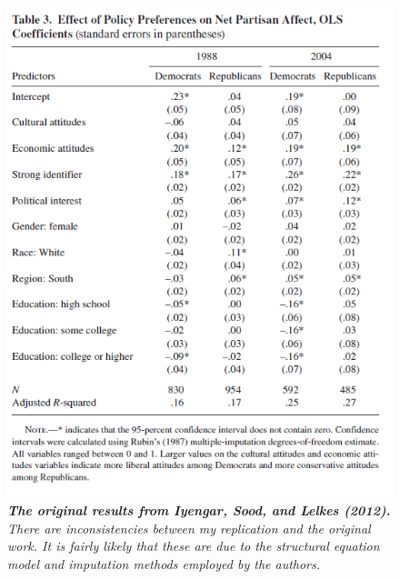 \documentclass[12pt]{article}
\begin{document}
\begin{figure}[H]
\center\includegraphics[width=5in]{isl-fig-3.png}
\caption{\label{fig:cdf-avg}\textit{\textbf{The original results from Iyengar, Sood, and Lelkes (2012).} There are inconsistencies between my replication and the original work. It is fairly likely that these are due to the structural equation model and imputation methods employed by the authors.}}
\end{figure}




\end{document}
